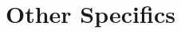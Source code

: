 \documentclass{sig-alternate}
\begin{document}


\appendix
\section{Other Specifics}
\label{app:other_specifics}


\end{document}
